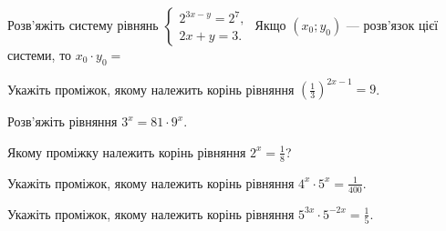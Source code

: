 \documentclass[12pt]{article}
\begin{document}

\begin{samepage}
\noindent\zadnum Розв'яжіть систему рівнянь $\begin{cases} 2^{3x-y} = 2^7, \\ 2x + y = 3. \end{cases}$ Якщо $(x_0; y_0)$ --- розв'язок цієї системи, то $x_0 \cdot y_0 =$ 

\nmtnobreak
{}
\par{}
\end{samepage}

\begin{samepage}
\noindent\zadnum Укажіть проміжок, якому належить корінь рівняння $\left(\displaystyle\frac{1}{3}\right)^{2x-1} = 9$. 

\nmtnobreak
\answerTable{$[2; +\infty)$}{$(-2; 0]$}{$(-\infty; -2]$}{$[1; 2)$}{$(0; 1]$}
\par{}
\end{samepage}

\begin{samepage}
\noindent\zadnum Розв'яжіть рівняння $3^x = 81 \cdot 9^x$. 

\nmtnobreak
{}
\par{}
\end{samepage}

\begin{samepage}
\noindent\zadnum Якому проміжку належить корінь рівняння $2^x = \displaystyle\frac{1}{8}$? 

\nmtnobreak
\answerTable{$(2; 4]$}{$(-6; -4]$}{$(-2; 0]$}{$(0; 2]$}{$(-4; -2]$}

\nmtnobreak
\par{}\vspace{0.25cm}
\end{samepage}

\begin{samepage}
\noindent\zadnum Укажіть проміжок, якому належить корінь рівняння $4^x \cdot 5^x = \displaystyle\frac{1}{400}$. 

\nmtnobreak
\answerTable{$[2; +\infty)$}{$[-0{,}5; 2)$}{$[-2; -0{,}5)$}{$[-10; -2)$}{$(-\infty; -10)$}
\par{}
\end{samepage}

\begin{samepage}
\noindent\zadnum Укажіть проміжок, якому належить корінь рівняння $5^{3x} \cdot 5^{-2x} = \displaystyle\frac{1}{5}$. 

\nmtnobreak
\answerTable{$(-\infty; -1]$}{$(-1; -0{,}5]$}{$(-0{,}5; 0]$}{$(0{,}5; +\infty)$}{$(0; 0{,}5]$}
\par{}
\end{samepage}
\end{document}
